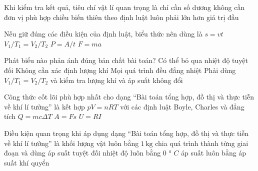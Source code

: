 \begin{ex}
Khi kiểm tra kết quả, tiêu chí vật lí quan trọng là
\choice
{chỉ cần số dương}
{không cần đơn vị}
{\True phù hợp chiều biến thiên theo định luật}
{luôn phải lớn hơn giá trị đầu}
\end{ex}

\begin{ex}
Nếu giữ đúng các điều kiện của định luật, biểu thức nên dùng là
\choice
{$s=vt$}
{\True $V_1/T_1=V_2/T_2$}
{$P=A/t$}
{$F=ma$}
\end{ex}

\begin{ex}
Phát biểu nào phản ánh đúng bản chất bài toán?
\choice
{Có thể bỏ qua nhiệt độ tuyệt đối}
{Không cần xác định lượng khí}
{Mọi quá trình đều đẳng nhiệt}
{\True Phải dùng $V_1/T_1=V_2/T_2$ và kiểm tra lượng khí và áp suất không đổi}
\end{ex}

\begin{ex}
Công thức cốt lõi phù hợp nhất cho dạng “Bài toán tổng hợp, đồ thị và thực tiễn về khí lí tưởng” là
\choice
{\True kết hợp $pV=nRT$ với các định luật Boyle, Charles và đẳng tích}
{$Q=mc\Delta T$}
{$A=Fs$}
{$U=RI$}
\end{ex}

\begin{ex}
Điều kiện quan trọng khi áp dụng dạng “Bài toán tổng hợp, đồ thị và thực tiễn về khí lí tưởng” là
\choice
{khối lượng vật luôn bằng $1\,\text{kg}$}
{\True chia quá trình thành từng giai đoạn và dùng áp suất tuyệt đối}
{nhiệt độ luôn bằng 0 ° $C$}
{áp suất luôn bằng áp suất khí quyển}
\end{ex}

